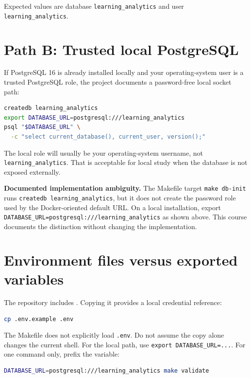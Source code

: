 Expected values are database \texttt{learning\_analytics} and user
\texttt{learning\_analytics}.

\section{Path B: Trusted local PostgreSQL}

If PostgreSQL 16 is already installed locally and your operating-system user is
a trusted PostgreSQL role, the project documents a password-free local socket
path:

\begin{lstlisting}[language=bash]
createdb learning_analytics
export DATABASE_URL=postgresql:///learning_analytics
psql "$DATABASE_URL" \
  -c "select current_database(), current_user, version();"
\end{lstlisting}

The local role will usually be your operating-system username, not
\texttt{learning\_analytics}. That is acceptable for local study when the
database is not exposed externally.

\begin{editionnote}
\textbf{Documented implementation ambiguity.} The Makefile target
\texttt{make db-init} runs \texttt{createdb learning\_analytics}, but it does
not create the password role used by the Docker-oriented default URL. On a
local installation, export
\texttt{DATABASE\_URL=postgresql:///learning\_analytics} as shown above. This
course documents the distinction without changing the implementation.
\end{editionnote}

\section{Environment files versus exported variables}

The repository includes . Copying it provides a local
credential reference:

\begin{lstlisting}[language=bash]
cp .env.example .env
\end{lstlisting}

The Makefile does not explicitly load \texttt{.env}. Do not assume the copy
alone changes the current shell. For the local path, use \texttt{export
DATABASE\_URL=...}. For one command only, prefix the variable:

\begin{lstlisting}[language=bash]
DATABASE_URL=postgresql:///learning_analytics make validate
\end{lstlisting}

